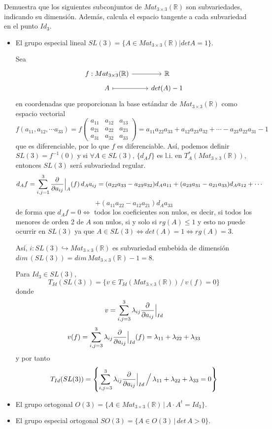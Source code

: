 \begin{ejer}
    [3.17] Demuestra que los siguientes subconjuntos de $Mat_{3\times 3}(\mathbb R)$ son subvariedades, indicando su dimensi\'on. Adem\'as, calcula el espacio tangente a cada subvariedad en el punto $Id_3$.
    \begin{itemize}
        \item El grupo especial lineal $SL(3) = \{A \in Mat_{3\times 3}(\mathbb R) | det A = 1\}$.
        \begin{sol}
            Sea 
            $$\bt f: Mat_{3 \times 3}(\mathbb R) \arrow{r} & \mathbb R \\[-5mm] A \arrow[mapsto]{r} & det(A)-1 \et$$
            en coordenadas que proporcionan la base est\'andar de $ Mat_{3 \times 3}(\mathbb R)$ como espacio vectorial
            $$f(a_{11}, a_{12}, \cdots a_{33}) = f \begin{pmatrix}
                a_{11} & a_{12} & a_{13} \\ a_{21} & a_{22} & a_{23} \\ a_{31} & a_{32} &  a_{33} 
            \end{pmatrix} = a_{11}a_{22}a_{33}+a_{12}a_{23}a_{32}+\cdots - a_{23}a_{22}a_{31} -1$$
            que es diferenciable, por lo que $f$ es diferenciable. As\'i, podemos definir $SL(3)=f^{-1}(0)$ y si $\forall A\in SL(3)$, $\{d_Af\}$ es l.i. en $T_A^*( Mat_{3 \times 3}(\mathbb R))$, entonces $SL(3)$ ser\'a subvariedad regular.
            $$d_Af=\sum_{i,j=1}^3 \dfrac{\partial^{} }{\partial a_{ij}}\Big|_A (f) \, d_Aa_{ij} = (a_{22}a_{33}-a_{23}a_{32}) d_A a_{11} + (a_{23}a_{31}-a_{21}a_{33}) d_Aa_{12} + \cdots $$ $$+ (a_{11}a_{22}-a_{12}a_{21})d_Aa_{33}$$
            de forma que $d_Af=0 \iff $ todos los coeficientes son nulos, es decir, si todos los menores de orden 2 de $A$ son nulos, si y solo si $rg(A) \leq 1$ y esto no puede ocurrir en $SL(3)$ ya que $A\in SL(3) \iff det(A)=1 \iff rg(A)=3$.
            
            As\'i, $i : SL(3) \hookrightarrow  Mat_{3 \times 3}(\mathbb R)$ es subvariedad embebida de dimensi\'on $dim\, (SL(3)) = dim \,  Mat_{3 \times 3}(\mathbb R)-1=8$.

            Para $Id_3\in SL(3)$, 
            $$T_{Id}(SL(3))=\{v \in T_{Id}( Mat_{3 \times 3}(\mathbb R)) \, / \, v(f)=0\}$$
            donde
            $$v=\sum_{i,j=3}^3 \lambda_{ij} \dfrac{\partial^{} }{\partial a_{ij}}\Big|_{Id}$$
            $$v(f)=\sum_{i,j=3}^3 \lambda_{ij} \dfrac{\partial^{} }{\partial a_{ij}}\Big|_{Id}(f)=\lambda_{11}+\lambda_{22}+\lambda_{33}$$
            y  por tanto
            $$T_{Id}(SL(3)) = \left\{ \sum_{i,j=3}^3 \lambda_{ij} \dfrac{\partial^{} }{\partial a_{ij}}\Big|_{Id} \, \Big/ \, \lambda_{11}+\lambda_{22}+\lambda_{33} =0  \right\}$$
        \end{sol}
        \item El grupo ortogonal $O(3) = \{A \in Mat_{3\times 3}(\mathbb R) \, | \,A \cdot A^t = Id_3\}$.
        \item El grupo especial ortogonal $SO(3) = \{A \in O(3) \, | \, det\,  A > 0\}$.
    \end{itemize}
\end{ejer}
